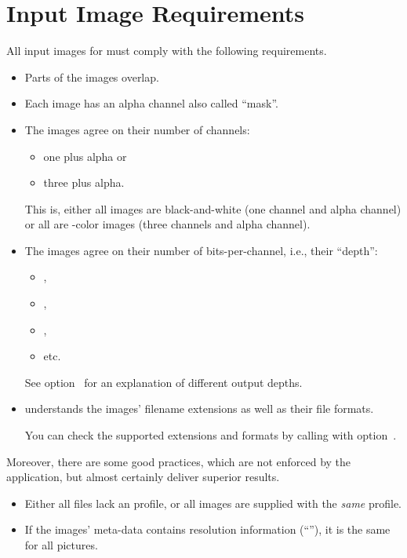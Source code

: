 

\section[Image Requirements]{Input Image Requirements
  \label{sec:image-requirements}
  }

All input images for \App{} must comply with the following
requirements.

\begin{itemize}
\item
  Parts of the images overlap.

\item
  Each image has an alpha channel also called ``mask''.

\item
  The images agree on their number of channels:
  \begin{itemize}
  \item
    one plus alpha or
  \item
    three plus alpha.
  \end{itemize}


  This is, either all images are black-and-white (one channel and alpha
  channel) or all are -color images (three channels and
  alpha channel).

\item
  The images agree on their number of bits-per-channel, i.e., their
  ``depth'':
  \begin{itemize}
  \item
    ,
  \item
    ,
  \item
    ,
  \item
    etc.
  \end{itemize}

  See option~ for an
  explanation of different output depths.

\item
  \App{} understands the images' filename extensions as well as their
  file formats.

  You can check the supported extensions and formats by calling \App{}
  with
  option~.
\end{itemize}

Moreover, there are some good practices, which are not enforced by the
application, but almost certainly deliver superior results.

\begin{itemize}
\item
  Either all files lack an  profile, or all images are
  supplied with the \emph{same}  profile.

\item
  If the images' meta-data contains resolution information
  (``''), it is the same for all pictures.
\end{itemize}
